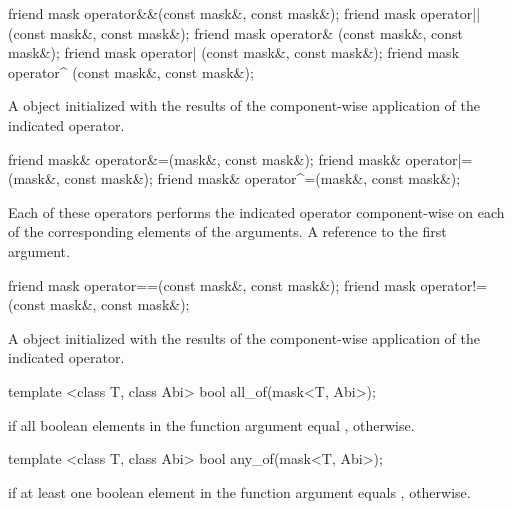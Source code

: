 
\begin{itemdecl}
friend mask operator&&(const mask&, const mask&);
friend mask operator||(const mask&, const mask&);
friend mask operator& (const mask&, const mask&);
friend mask operator| (const mask&, const mask&);
friend mask operator^ (const mask&, const mask&);
\end{itemdecl}
\begin{itemdescr}
  \pnum\returns A \mask object initialized with the results of the component-wise application of the indicated operator.
\end{itemdescr}

\begin{itemdecl}
friend mask& operator&=(mask&, const mask&);
friend mask& operator|=(mask&, const mask&);
friend mask& operator^=(mask&, const mask&);
\end{itemdecl}
\begin{itemdescr}
  \pnum\effects Each of these operators performs the indicated operator component-wise on each of the corresponding elements of the arguments.
  \pnum\returns A reference to the first argument.
\end{itemdescr}

\begin{itemdecl}
friend mask operator==(const mask&, const mask&);
friend mask operator!=(const mask&, const mask&);
\end{itemdecl}
\begin{itemdescr}
  \pnum\returns A \mask object initialized with the results of the component-wise application of the indicated operator.
\end{itemdescr}

\begin{itemdecl}
template <class T, class Abi> bool  all_of(mask<T, Abi>);
\end{itemdecl}
\begin{itemdescr}
  \pnum\returns \true if all boolean elements in the function argument equal \true, \false otherwise.
\end{itemdescr}

\begin{itemdecl}
template <class T, class Abi> bool  any_of(mask<T, Abi>);
\end{itemdecl}
\begin{itemdescr}
  \pnum\returns \true if at least one boolean element in the function argument equals \true, \false otherwise.
\end{itemdescr}


